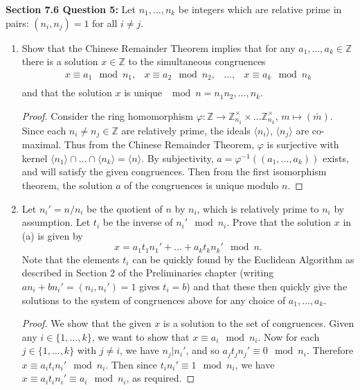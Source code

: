 \documentclass{article}
\begin{document}
\textbf{Section 7.6 Question 5:} Let $n_1,\ldots,n_k$ be integers which are
  relative prime in pairs: $(n_i,n_j)=1$ for all $i\neq j$.
  \begin{enumerate}[label={\bf(\alph*)}]
    \item Show that the Chinese Remainder Theorem implies that for any
      $a_1,\ldots,a_k\in\mathbb{Z}$ there is a solution $x\in\mathbb{Z}$ to
      the simultaneous congruences
      \[\begin{array}{cccc}
        x\equiv a_1\mod{n_1}, &
        x\equiv a_2\mod{n_2}, &
        \ldots, &
        x\equiv a_k\mod{n_k} \\
      \end{array}\]
      and that the solution $x$ is unique $\mod{n}=n_1n_2,\ldots,n_k$.

      \begin{proof}
        Consider the ring homomorphism $\varphi:\mathbb{Z}\rightarrow
        \mathbb{Z}_{n_1}^\times \times\ldots \mathbb{Z}_{n_k}^\times$,
        $m\mapsto (\bar{m})$. Since each $n_i\neq n_j\in\mathbb{Z}$ are
        relatively prime, the ideals $\langle n_i\rangle$, $\langle
        n_j\rangle$ are co-maximal. Thus from the Chinese Remainder
        Theorem, $\varphi$ is surjective with kernel $\langle n_1\rangle
        \cap\ldots \cap\langle n_k\rangle =\langle n\rangle$. By
        subjectivity, $a=\varphi^{-1}((a_1,\ldots,a_k))$ exists, and will
        satisfy the given congruences. Then from the first isomorphism
        theorem, the solution $a$ of the congruences is unique modulo
        $n$.
      \end{proof}

    \item Let $n_i'=n/n_i$ be the quotient of $n$ by $n_i$, which is
      relatively prime to $n_i$ by assumption. Let $t_i$ be the inverse of
      $n_i'\mod{n_i}$. Prove that the solution $x$ in (a) is given by
      \[x=a_1t_1n_1'+\ldots+a_kt_kn_k'\mod{n}.\]
      Note that the elements $t_i$ can be quickly found by the Euclidean
      Algorithm as described in Section 2 of the Preliminaries chapter
      (writing $an_i+bn_i'=(n_i,n_i')=1$ gives $t_i=b$) and that these then
      quickly give the solutions to the system of congruences above for any
      choice of $a_1,\ldots,a_k$.

      \begin{proof}
        We show that the given $x$ is a solution to the set of congruences.
        Given any $i\in\{1,\ldots,k\}$, we want to show that $x\equiv
        a_i\mod{n_i}$. Now for each $j\in\{1,\ldots,k\}$ with $j\neq i$, we
        have $n_j|n_i'$, and so $a_jt_jn_j'\equiv0\mod{n_i}$. Therefore
        $x\equiv a_it_in_i'\mod{n_i}$. Then since
        $t_in_i'\equiv1\mod{n_i}$, we have $x\equiv a_it_in_i'\equiv
        a_i\mod{n_i}$, as required.
      \end{proof}


\end{enumerate}
\end{document}
